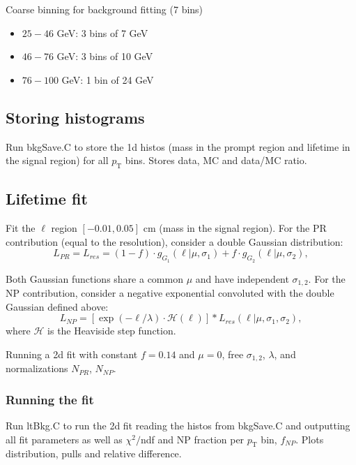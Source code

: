 \documentclass{article}
\newcommand{\pt}{p_\text{T}}
\begin{document}
Coarse binning for background fitting (7 bins)
\begin{itemize}
\item $25-46$ GeV: 3 bins of 7 GeV
\item $46-76$ GeV: 3 bins of 10 GeV
\item $76-100$ GeV: 1 bin of 24 GeV
\end{itemize}

\subsection{Storing histograms}

Run bkgSave.C to store the 1d histos (mass in the prompt region and lifetime in the signal region) for all $\pt$ bins. Stores data, MC and data/MC ratio.


\subsection{Lifetime fit}

Fit the $\ell$ region $[-0.01,0.05]$ cm (mass in the signal region). For the PR contribution (equal to the resolution), consider a double Gaussian distribution:
\begin{equation}
L_{PR}=L_{res} = (1-f)\cdot g_{G_1}(\ell|\mu, \sigma_1)+f\cdot g_{G_2}(\ell|\mu, \sigma_2),
\end{equation}

Both Gaussian functions share a common $\mu$ and have independent $\sigma_{1,2}$. For the NP contribution, consider a negative exponential convoluted with the double Gaussian defined above:
\begin{equation}
L_{NP}=	\left[\exp(-\ell/\lambda)\cdot\mathcal{H}(\ell)\right]*L_{res}(\ell|\mu, \sigma_1,\sigma_2),
\end{equation}
where $\mathcal{H}$ is the Heaviside step function.

Running a 2d fit with constant $f=0.14$ and $\mu=0$, free $\sigma_{1,2}$, $\lambda$, and normalizations $N_{PR}$, $N_{NP}$.

\subsubsection{Running the fit}

Run ltBkg.C to run the 2d fit reading the histos from bkgSave.C and outputting all fit parameters as well as $\chi^2/$ndf and NP fraction per $\pt$ bin, $f_{NP}$. Plots distribution, pulls and relative difference.
\end{document}
